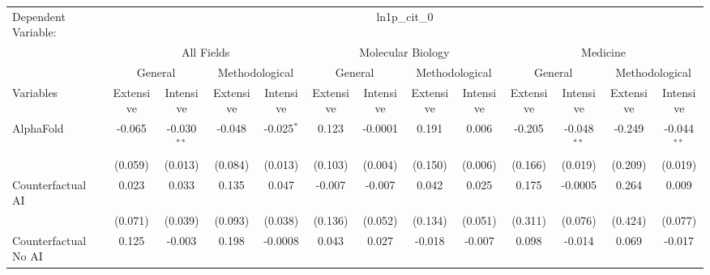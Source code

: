 \begingroup
\centering
\begin{tabular}{lcccccccccccc}
   \tabularnewline \midrule \midrule
   Dependent Variable: & \multicolumn{12}{c}{ln1p\_cit\_0}\\
 & \multicolumn{4}{c}{All Fields} & \multicolumn{4}{c}{Molecular Biology} & \multicolumn{4}{c}{Medicine} \\
\cmidrule(lr){2-5} \cmidrule(lr){6-9} \cmidrule(lr){10-13}
 & \multicolumn{2}{c}{General} & \multicolumn{2}{c}{Methodological} & \multicolumn{2}{c}{General} & \multicolumn{2}{c}{Methodological} & \multicolumn{2}{c}{General} & \multicolumn{2}{c}{Methodological} \\
\cmidrule(lr){2-3} \cmidrule(lr){4-5} \cmidrule(lr){6-7} \cmidrule(lr){8-9} \cmidrule(lr){10-11} \cmidrule(lr){12-13}
Variables & \multicolumn{1}{c}{Extensive} & \multicolumn{1}{c}{Intensive} & \multicolumn{1}{c}{Extensive} & \multicolumn{1}{c}{Intensive} & \multicolumn{1}{c}{Extensive} & \multicolumn{1}{c}{Intensive} & \multicolumn{1}{c}{Extensive} & \multicolumn{1}{c}{Intensive} & \multicolumn{1}{c}{Extensive} & \multicolumn{1}{c}{Intensive} & \multicolumn{1}{c}{Extensive} & \multicolumn{1}{c}{Intensive} \\
\cmidrule(lr){1-1}\cmidrule(lr){2-2} \cmidrule(lr){3-3} \cmidrule(lr){4-4} \cmidrule(lr){5-5} \cmidrule(lr){6-6} \cmidrule(lr){7-7} \cmidrule(lr){8-8} \cmidrule(lr){9-9} \cmidrule(lr){10-10} \cmidrule(lr){11-11} \cmidrule(lr){12-12} \cmidrule(lr){13-13}
   AlphaFold                                & -0.065  & -0.030$^{**}$ & -0.048  & -0.025$^{*}$ & 0.123   & -0.0001 & 0.191   & 0.006         & -0.205  & -0.048$^{**}$ & -0.249  & -0.044$^{**}$\\   
                                            & (0.059) & (0.013)       & (0.084) & (0.013)      & (0.103) & (0.004) & (0.150) & (0.006)       & (0.166) & (0.019)       & (0.209) & (0.019)\\   
   Counterfactual AI                        & 0.023   & 0.033         & 0.135   & 0.047        & -0.007  & -0.007  & 0.042   & 0.025         & 0.175   & -0.0005       & 0.264   & 0.009\\   
                                            & (0.071) & (0.039)       & (0.093) & (0.038)      & (0.136) & (0.052) & (0.134) & (0.051)       & (0.311) & (0.076)       & (0.424) & (0.077)\\   
   Counterfactual No AI                     & 0.125   & -0.003        & 0.198   & -0.0008      & 0.043   & 0.027   & -0.018  & -0.007        & 0.098   & -0.014        & 0.069   & -0.017\\   

\end{tabular}
